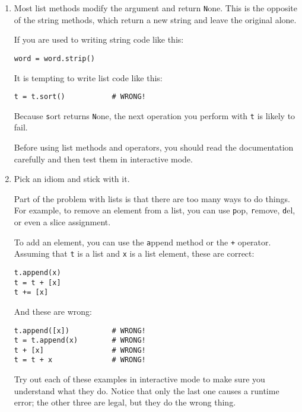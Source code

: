 \documentclass[
DIV=11,
fontsize=13,
twoside,
headinclude=false,
titlepage=firstiscover,
abstract=true,
headsepline=true,
footsepline=true,
chapterprefix=true, %
headings=big,
bibliography=totoc,%
captions=tableheading
]{scrbook}
\theoremstyle{definition}
\begin{document}
\begin{enumerate}

\item Most list methods modify the argument and
  return {\texttt None}.  This is the opposite of the string methods,
  which return a new string and leave the original alone.

If you are used to writing string code like this:

\begin{lstlisting}
word = word.strip()
\end{lstlisting}

It is tempting to write list code like this:

\begin{lstlisting}
t = t.sort()           # WRONG!
\end{lstlisting}

Because {\texttt sort} returns {\texttt None}, the
next operation you perform with {\texttt t} is likely to fail.

Before using list methods and operators, you should read the
documentation carefully and then test them in interactive mode.

\item Pick an idiom and stick with it.

Part of the problem with lists is that there are too many
ways to do things.  For example, to remove an element from
a list, you can use {\texttt pop}, {\texttt remove}, {\texttt del},
or even a slice assignment.

To add an element, you can use the {\texttt append} method or
the {\texttt +} operator.  Assuming that {\texttt t} is a list and
{\texttt x} is a list element, these are correct: 

\begin{lstlisting}
t.append(x)
t = t + [x]
t += [x]
\end{lstlisting}

And these are wrong:

\begin{lstlisting}
t.append([x])          # WRONG!
t = t.append(x)        # WRONG!
t + [x]                # WRONG!
t = t + x              # WRONG!
\end{lstlisting}

Try out each of these examples in interactive mode to make sure
you understand what they do.  Notice that only the last
one causes a runtime error; the other three are legal, but they
do the wrong thing.



\end{enumerate}
\end{document}
